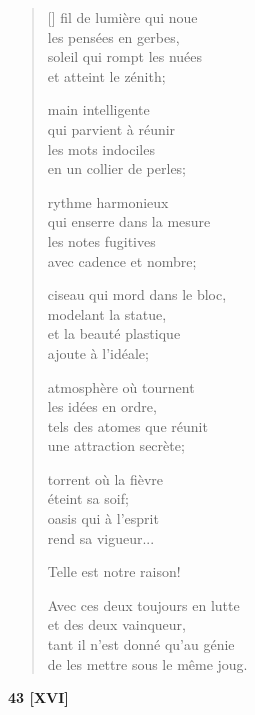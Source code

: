 \documentclass[a4paper,12pt]{book}
\begin{document}
\begin{verse}[\versewidth]
  fil de lumière qui noue \\
  les pensées en gerbes, \\
  soleil qui rompt les nuées \\
  et atteint le zénith;

  main intelligente \\
  qui parvient à réunir \\
  les mots indociles \\
  en un collier de perles;

  rythme harmonieux \\
  qui enserre dans la mesure \\
  les notes fugitives \\
  avec cadence et nombre;

  ciseau qui mord dans le bloc, \\
  modelant la statue, \\
  et la beauté plastique \\
  ajoute à l'idéale;

  atmosphère où tournent \\
  les idées en ordre, \\
  tels des atomes que réunit \\
  une attraction secrète;

  torrent où la fièvre \\
  éteint sa soif; \\
  oasis qui à l'esprit \\
  rend sa vigueur...

  Telle est notre raison!

  Avec ces deux toujours en lutte \\
  et des deux vainqueur, \\
  tant il n'est donné qu'au génie \\
  de les mettre sous le même joug.
\end{verse}

\bigskip

\begin{center}
  \textbf{43 [XVI]}
\end{center}

\settowidth{\versewidth}{Si, quand les clochettes bleues de ton balcon}
\end{document}
